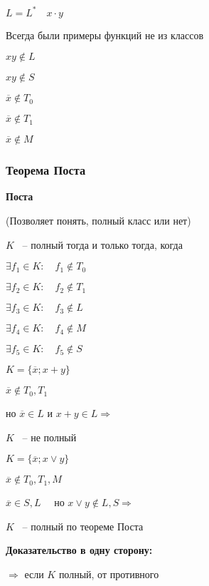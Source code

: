 \documentclass[russian]{lecture-notes}
\begin{document}
\begin{example}
	$L = L^* \quad x \cdot y$
	
	Всегда были примеры функций не из классов
	
	$xy \notin L$
	
	$xy \notin S$
	
	$\overline{x} \notin T_0$
	
	$\overline{x} \notin T_1$
	
	$\overline{x} \notin M$
\end{example}

\subsubsection{Теорема Поста}

\begin{theorem}
	\textbf{Поста}

	(Позволяет понять, полный класс или нет)
	
	$K$ ~-- полный тогда и только тогда, когда
	
	$\exists f_1 \in K: \quad f_1 \notin T_0$	
	
	$\exists f_2 \in K: \quad f_2 \notin T_1$

	$\exists f_3 \in K: \quad f_3 \notin L$

	$\exists f_4 \in K: \quad f_4 \notin M$

	$\exists f_5 \in K: \quad f_5 \notin S$
\end{theorem}

\begin{example}
	$K = \{ \overline{x}; x + y \}$
	
	$\overline{x} \notin T_0, T_1$
	
	но $\overline{x} \in L$ и $x + y \in L \Rightarrow$
	
	$K$ ~-- не полный 
\end{example}

\begin{example}
	$K = \{ \overline{x}; x \lor y \}$
	
	$\overline{x} \notin T_0, T_1, M$
	
	$\overline{x} \in S, L \quad $ но $x \lor y \notin L, S \Rightarrow$
		
	$K$ ~-- полный по теореме Поста
\end{example}

	\textbf{Доказательство в одну сторону:}
	
	$\Rightarrow$ если $K$ полный, от противного
	
\end{document}

